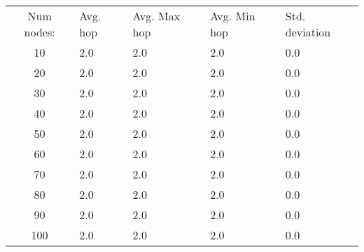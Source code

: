 \begin{tabular}{cllll}
Num nodes: & Avg. hop & Avg. Max hop & Avg. Min hop & Std. deviation \\
10       & 2.0        & 2.0            & 2.0 & 0.0 \\
20       & 2.0        & 2.0            & 2.0 & 0.0 \\
30       & 2.0        & 2.0            & 2.0 & 0.0 \\
40       & 2.0        & 2.0            & 2.0 & 0.0 \\
50       & 2.0        & 2.0            & 2.0 & 0.0 \\
60       & 2.0        & 2.0            & 2.0 & 0.0 \\
70       & 2.0        & 2.0            & 2.0 & 0.0 \\
80       & 2.0        & 2.0            & 2.0 & 0.0 \\
90       & 2.0        & 2.0            & 2.0 & 0.0 \\
100       & 2.0        & 2.0            & 2.0 & 0.0 \\
\end{tabular}